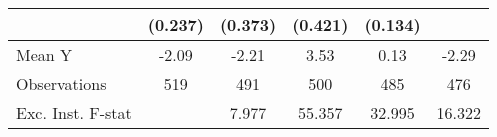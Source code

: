 {\begin{tabular}{l*{5}{c}}
            &     (0.237)         &     (0.373)         &     (0.421)         &     (0.134)         &                     \\
\midrule
Mean Y      &       -2.09         &       -2.21         &        3.53         &        0.13         &       -2.29         \\
Observations&         519         &         491         &         500         &         485         &         476         \\
Exc. Inst. F-stat&                     &       7.977         &      55.357         &      32.995         &      16.322         \\
\bottomrule
\end{tabular}
}
